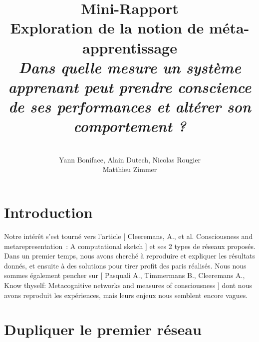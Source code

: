 \documentclass[a4paper,12pt]{article}
\title{
  \textbf{Mini-Rapport}
  \\[5cm]
  Exploration de la notion de méta-apprentissage
  \\[3cm]
  \textit{
  Dans quelle mesure un système apprenant peut prendre conscience de ses performances
  et altérer son comportement ?}
}
\author{
  \\[3cm]
  Yann Boniface, Alain Dutech, Nicolas Rougier \\
  Matthieu Zimmer}
\begin{document}
\maketitle








\newpage
\section{Introduction}

Notre intérêt s'est tourné vers l'article [ Cleeremans, A., et al. Consciousness and 
metarepresentation : A computational sketch ] et ses 2 types de réseaux proposés.
Dans un premier temps, nous avons cherché à reproduire et expliquer les résultats
donnés, et ensuite à des solutions pour tirer profit des paris réalisés.
\newline
Nous nous sommes également pencher sur [ Pasquali A., Timmermans B., Cleeremans A., Know
thyself: Metacognitive networks and measures of consciousness ] dont nous avons reproduit
les expériences, mais leurs enjeux nous semblent encore vagues.


\section{Dupliquer le premier réseau}
\end{document}
